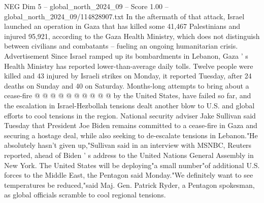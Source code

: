 \begin{textsample}{NEG Dim 5 – global\_north\_2024\_09 – Score 1.00 – global\_north\_2024\_09/114828907.txt}
In the aftermath of that attack, Israel launched an operation in Gaza that has killed some 41,467 Palestinians and injured 95,921, according to the Gaza Health Ministry, which does not distinguish between civilians and combatants -- fueling an ongoing humanitarian crisis.
Advertisement Since Israel ramped up its bombardments in Lebanon, Gaza ' s Health Ministry has reported lower-than-average daily tolls.
Twelve people were killed and 43 injured by Israeli strikes on Monday, it reported Tuesday, after 24 deaths on Sunday and 40 on Saturday.
Months-long attempts to bring about a cease-fire @ @ @ @ @ @ @ @ @ @ by the United States, have failed so far, and the escalation in Israel-Hezbollah tensions dealt another blow to U.S. and global efforts to cool tensions in the region.
National security adviser Jake Sullivan said Tuesday that President Joe Biden remains committed to a cease-fire in Gaza and securing a hostage deal, while also seeking to de-escalate tensions in Lebanon."He absolutely hasn't given up,"Sullivan said in an interview with MSNBC, Reuters reported, ahead of Biden ' s address to the United Nations General Assembly in New York.
The United States will be deploying"a small number"of additional U.S. forces to the Middle East, the Pentagon said Monday."We definitely want to see temperatures be reduced,"said Maj.
Gen.
Patrick Ryder, a Pentagon spokesman, as global officials scramble to cool regional tensions.

\end{textsample}
